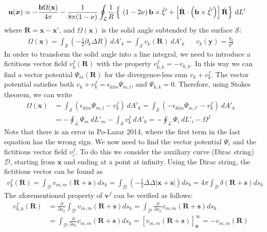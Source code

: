 \begin{align}
 \mathbf{u}(\bm x)=-\frac{\mathbf{ b}\Omega(\mathbf x)}{4\pi}-\frac{1}{8\pi(1-\nu)}\oint_\mathcal{L}&\frac{1}{R}\left\{\ 
 \left(1-2\nu\right) \mathbf{ b}\times\hat{\mathbf{ \xi}}'
+ \left[\hat{\mathbf{ R}}\cdot\left(\mathbf{ b}\times\hat{\mathbf{ \xi}}' \right) \right]\hat{\mathbf{ R}}  \right\}\dL'
\end{align}
where $\mathbf{R}=\mathbf x-\mathbf x'$, and  $\Omega(\mathbf x)$ is the solid angle subtended by the surface $\mathcal{S}$:
\begin{align}
\Omega(\mathbf{x})=\int_\mathcal{S}\left(-\frac{1}{2}\partial_k\Delta R\right)\ dA'_k=\int_\mathcal{S} v_k(\mathbf R)\ dA'_k&&v_k(\mathbf y)=\frac{y_k}{y^3}
\end{align}
In order to transform the solid angle into a line integral, we need to introduce a fictitious vector field $v_k^f(\mathbf R)$ with the property $v^f_{k,k}=-v_{k,k}$. In this way we can find a vector potential $\Psi_m(\mathbf{R})$ for the divergence-less sum $v_k+v^f_k$. The vector potential satisfies both $v_k+v^f_k=\epsilon_{klm}\Psi_{m,l}$, and $\Psi_{k,k}=0$. Therefore, using Stokes theorem, we can write
\begin{align}
\Omega(\mathbf{x})&=\int_\mathcal{S} \left(\epsilon_{klm}\Psi_{m,l}-v^f_k\right)\ dA'_k=\int_\mathcal{S} \left(-\epsilon_{klm}\Psi_{m,l'}-v^f_k\right)\ dA'_k\nonumber\\
&=-\oint_\mathcal{L}\Psi_m\ dL'_m-\int_\mathcal{S} v^f_k\ dA'_k=-\oint_\mathcal{L}\Psi_i\ dL'_i-\Omega^f
\end{align}
Note that there is an error in Po-Lazar 2014, where the first term in the last equation has the wrong sign.
We now need to find the vector potential $\Psi_i$ and the fictitious vector field $v_i^f$. To do this we consider the auxiliary curve (Dirac string) $\mathcal{D}$, starting from $\mathbf x$ and ending at a point at infinity. Using the Dirac string, the fictitious vector can be found as
\begin{align}
v^f_{k}(\mathbf{R})=\int_\mathcal{D}v_{m,m}(\mathbf{R}+\mathbf{s})ds_k
=\int_\mathcal{D}\left(-\frac{1}{2}\Delta\Delta |\mathbf{x}+\mathbf{s}|\right)ds_k
=4\pi\int_\mathcal{D}\delta(\mathbf{R}+\mathbf{s})ds_k
\end{align}
The aforementioned property of $\mathbf v^f$ can be verified as follows:
\begin{align}
v^f_{k,k}(\mathbf{R})
&=\frac{\partial}{\partial x_k}\int_\mathcal{D}v_{m,m}(\mathbf{R}+\mathbf{s})ds_k
=\int_\mathcal{D}\frac{\partial}{\partial x_k}v_{m,m}(\mathbf{R}+\mathbf{s})ds_k\nonumber\\
&=\int_\mathcal{D}\frac{\partial}{\partial s_k}v_{m,m}(\mathbf{R}+\mathbf{s})ds_k
=\left[v_{m,m}(\mathbf{R}+\mathbf{s})\right]_\mathbf{0}^\infty=-v_{m,m}(\mathbf{R})
\end{align}

